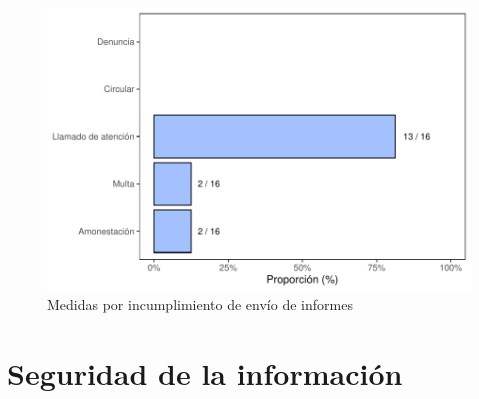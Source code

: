 \documentclass[
]{book}
\begin{document}
\begin{figure}
\includegraphics[width=0.85\linewidth]{InformeFinal_files/figure-latex/IncumplimientoEnvioInformes-1} \caption{Medidas por incumplimiento de envío de informes}\label{fig:IncumplimientoEnvioInformes}
\end{figure}

\hypertarget{seguridad-de-la-informaciuxf3n}{%
\section{Seguridad de la información}\label{seguridad-de-la-informaciuxf3n}}
\end{document}
